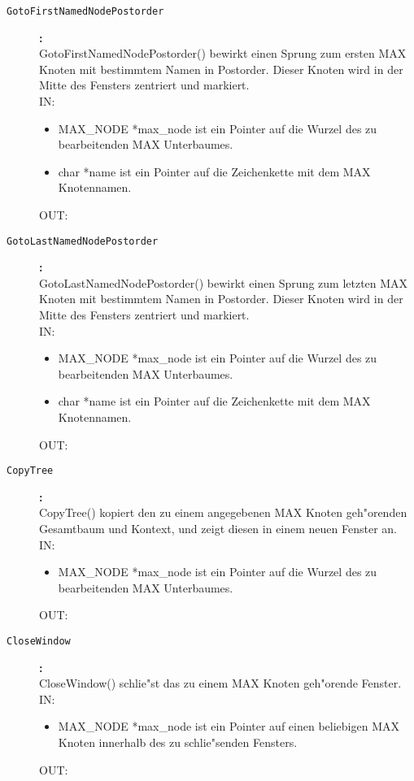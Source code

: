 \begin{description}
\item[\tt GotoFirstNamedNodePostorder]{\bf :\\}
GotoFirstNamedNodePostorder() bewirkt einen Sprung zum ersten MAX Knoten mit bestimmtem Namen in Postorder. Dieser Knoten wird in der Mitte des Fensters zentriert und markiert. \\
IN:
\begin{itemize}
   \item MAX\_NODE *max\_node ist ein Pointer auf die Wurzel des zu bearbeitenden MAX Unterbaumes.
   \item char *name ist ein Pointer auf die Zeichenkette mit dem MAX Knotennamen.
\end{itemize}
OUT:

\item[\tt GotoLastNamedNodePostorder]{\bf :\\}
GotoLastNamedNodePostorder() bewirkt einen Sprung zum letzten MAX Knoten mit bestimmtem Namen in Postorder. Dieser Knoten wird in der Mitte des Fensters zentriert und markiert. \\
IN:
\begin{itemize}
   \item MAX\_NODE *max\_node ist ein Pointer auf die Wurzel des zu bearbeitenden MAX Unterbaumes.
   \item char *name ist ein Pointer auf die Zeichenkette mit dem MAX Knotennamen.
\end{itemize}
OUT:

\item[\tt CopyTree]{\bf :\\}
CopyTree() kopiert den zu einem angegebenen MAX Knoten geh"orenden Gesamtbaum und Kontext, und zeigt diesen in einem neuen Fenster an. \\
IN:
\begin{itemize}
   \item MAX\_NODE *max\_node ist ein Pointer auf die Wurzel des zu bearbeitenden MAX Unterbaumes.
\end{itemize}
OUT:

\item[\tt CloseWindow]{\bf :\\}
CloseWindow() schlie"st das zu einem MAX Knoten geh"orende Fenster. \\
IN:
\begin{itemize}
   \item MAX\_NODE *max\_node ist ein Pointer auf einen beliebigen MAX Knoten innerhalb des zu schlie"senden Fensters.
\end{itemize}
OUT:


\end{description}
